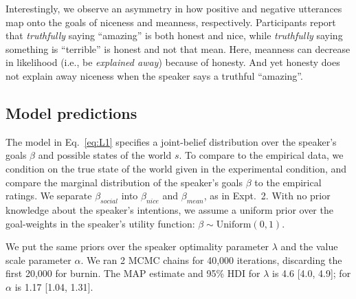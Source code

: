 \documentclass[10pt,letterpaper]{article}
\begin{document}
Interestingly, we observe an asymmetry in how positive and negative utterances map onto the goals of niceness and meanness, respectively. 
Participants report that \emph{truthfully} saying ``amazing'' is both honest and nice, while \emph{truthfully} saying something is ``terrible'' is honest and not that mean.
Here, meanness can decrease in likelihood (i.e., be \emph{explained away}) because of honesty.
And yet honesty does not explain away niceness when the speaker says a truthful ``amazing''. 


\subsection{Model predictions}

The model in Eq.~\ref{eq:L1} specifies a joint-belief distribution over the speaker's goals $\beta$ and possible states of the world $s$.
To compare to the empirical data, we condition on the true state of the world given in the experimental condition, and compare the marginal distribution of the speaker's goals $\beta$ to the empirical ratings.
We separate $\beta_{social}$ into  $\beta_{nice}$ and  $\beta_{mean}$, as in Expt.~2.
With no prior knowledge about the speaker's intentions, we assume a uniform prior over the goal-weights in the speaker's utility function: $\beta \sim \text{Uniform}(0,1)$.

We put the same priors over the speaker optimality parameter $\lambda$ and the value scale parameter $\alpha$.
We ran 2 MCMC chains for 40,000 iterations, discarding the first 20,000 for burnin.
The MAP estimate and 95\% HDI for $\lambda$ is 4.6 [4.0, 4.9]; for $\alpha$ is 1.17 [1.04, 1.31].%
\end{document}
